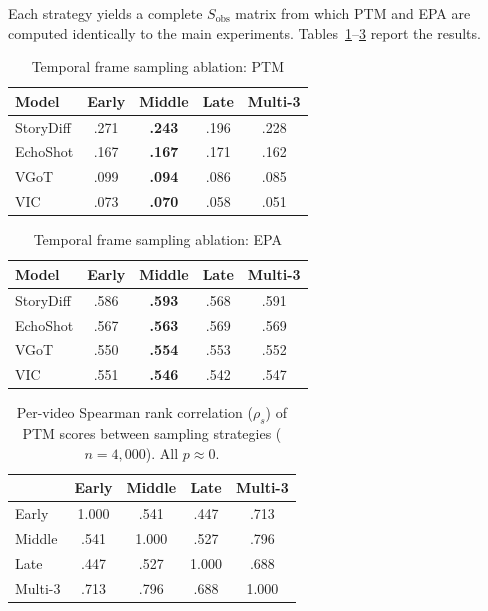 \documentclass[sigconf,review,anonymous]{acmart}
\begin{document}
\noindent Each strategy yields a complete $S_\text{obs}$ matrix from which PTM and EPA are computed identically to the main experiments. Tables~\ref{tab:temporal_ablation_ptm}--\ref{tab:temporal_ablation_spearman} report the results.
\begin{table}[ht]
\caption{Temporal frame sampling ablation: PTM }
\label{tab:temporal_ablation_ptm}
\centering
\small
\begin{tabular}{@{}lcccc@{}}
\toprule
Model & Early & Middle & Late & Multi-3 \\
\midrule
StoryDiff & .271 & \textbf{.243} & .196 & .228 \\
EchoShot  & .167 & \textbf{.167} & .171 & .162 \\
VGoT      & .099 & \textbf{.094} & .086 & .085 \\
VIC       & .073 & \textbf{.070} & .058 & .051 \\
\bottomrule
\end{tabular}
\end{table}

\begin{table}[ht]
\caption{Temporal frame sampling ablation: EPA}
\label{tab:temporal_ablation_epa}
\centering
\small
\begin{tabular}{@{}lcccc@{}}
\toprule
Model & Early & Middle & Late & Multi-3 \\
\midrule
StoryDiff & .586 & \textbf{.593} & .568 & .591 \\
EchoShot  & .567 & \textbf{.563} & .569 & .569 \\
VGoT      & .550 & \textbf{.554} & .553 & .552 \\
VIC       & .551 & \textbf{.546} & .542 & .547 \\
\bottomrule
\end{tabular}
\end{table}

\begin{table}[ht]
\caption{Per-video Spearman rank correlation ($\rho_s$) of PTM scores between sampling strategies ($n = 4{,}000$). All $p \approx 0$.}
\label{tab:temporal_ablation_spearman}
\centering
\small
\begin{tabular}{@{}lcccc@{}}
\toprule
 & Early & Middle & Late & Multi-3 \\
\midrule
Early  & 1.000 & .541 & .447 & .713 \\
Middle & .541 & 1.000 & .527 & .796 \\
Late   & .447 & .527 & 1.000 & .688 \\
Multi-3 & .713 & .796 & .688 & 1.000 \\
\bottomrule
\end{tabular}
\end{table}
\end{document}
